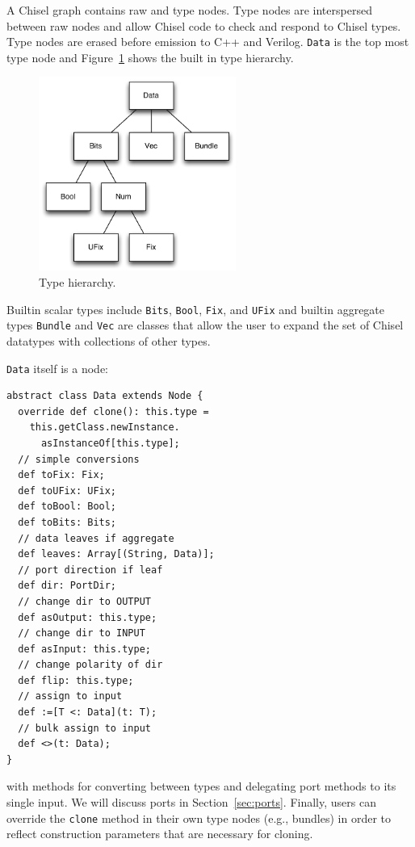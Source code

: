 \documentclass[10pt,twocolumn]{article}
\def\code#1{{\small\tt #1}}
\begin{document}
A Chisel graph contains raw and type nodes.  Type nodes are
interspersed between raw nodes and allow Chisel code to
check and respond to Chisel types.  Type nodes are erased before
emission to C++ and Verilog.  \code{Data} is the top most type node
and Figure~\ref{fig:type-hierarchy} shows the built in type hierarchy.

\begin{figure}[h]
\centering
\includegraphics[height=2.5in]{figs/type-hierarchy.pdf}
\caption{Type hierarchy.}
\label{fig:type-hierarchy}
\end{figure}

\noindent
Builtin scalar types include \code{Bits}, \code{Bool}, \code{Fix}, and
\code{UFix} and builtin aggregate types \code{Bundle} and \code{Vec}
are classes that allow the user to expand
the set of Chisel datatypes with collections of other types.

\code{Data} itself is a node:

\begin{lstlisting}
abstract class Data extends Node {
  override def clone(): this.type =
    this.getClass.newInstance.
      asInstanceOf[this.type];
  // simple conversions
  def toFix: Fix;
  def toUFix: UFix;
  def toBool: Bool;
  def toBits: Bits;
  // data leaves if aggregate
  def leaves: Array[(String, Data)];
  // port direction if leaf
  def dir: PortDir;
  // change dir to OUTPUT
  def asOutput: this.type;
  // change dir to INPUT
  def asInput: this.type;
  // change polarity of dir
  def flip: this.type;
  // assign to input
  def :=[T <: Data](t: T);
  // bulk assign to input
  def <>(t: Data);
}
\end{lstlisting}

\noindent
with methods for converting between types and 
delegating port methods to its single input.   
We will discuss ports in Section~\ref{sec:ports}.
Finally, users can override the \code{clone} method in their own type nodes (e.g., bundles) in
order to reflect construction parameters that are necessary for cloning.
\end{document}
